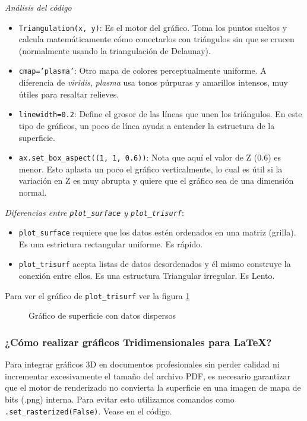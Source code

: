 \emph{Análisis del código}
\begin{itemize}
    \item \texttt{Triangulation(x, y)}: Es el motor del gráfico. Toma los puntos sueltos y calcula matemáticamente cómo conectarlos con triángulos sin que se crucen (normalmente usando la triangulación de Delaunay).
    \item \texttt{cmap='plasma'}: Otro mapa de colores perceptualmente uniforme. A diferencia de \textit{viridis}, \textit{plasma} usa tonos púrpuras y amarillos intensos, muy útiles para resaltar relieves.
    \item \texttt{linewidth=0.2}: Define el grosor de las líneas que unen los triángulos. En este tipo de gráficos, un poco de línea ayuda a entender la estructura de la superficie.
    \item \texttt{ax.set\_box\_aspect((1, 1, 0.6))}: Nota que aquí el valor de Z (0.6) es menor. Esto aplasta un poco el gráfico verticalmente, lo cual es útil si la variación en Z es muy abrupta y quiere que el gráfico sea de una dimensión normal.
\end{itemize}

\emph{Diferencias entre \texttt{plot\_surface} y \texttt{plot\_trisurf}}:

\begin{itemize}
\item \texttt{plot\_surface} requiere que los datos estén ordenados en una matriz (grilla). Es una estrictura rectangular uniforme. Es rápido.
\item \texttt{plot\_trisurf} acepta listas de datos desordenados y él mismo construye la conexión entre ellos. Es una estructura Triangular irregular. Es Lento.
\end{itemize}

Para ver el gráfico de \texttt{plot\_trisurf} ver la figura \ref{fig:grafico_3D_Triangulado}
\begin{figure}[ht]
    \centering
     
    \caption{Gráfico de superficie con datos dispersos}
    \label{fig:grafico_3D_Triangulado}
\end{figure}


\subsubsection{¿Cómo realizar gráficos Tridimensionales para \LaTeX ?}

Para integrar gráficos 3D en documentos profesionales sin perder calidad ni incrementar excesivamente el tamaño del archivo PDF, es necesario garantizar que el motor de renderizado no convierta la superficie en una imagen de mapa de bits (.png) interna. Para evitar esto utilizamos comandos como \texttt{.set\_rasterized(False)}. Vease en el código.

